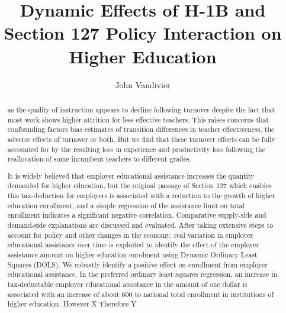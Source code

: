 \documentclass[review]{elsarticle}
\begin{document}
\begin{frontmatter}

\title{
    Dynamic Effects of H-1B and Section 127 Policy Interaction on Higher Education
}

\author[mymainaddress]{John Vandivier} %
\address[mymainaddress]{4400 University Dr, Fairfax, VA 22030}

\begin{abstract}
    as the quality of instruction appears to decline following turnover despite the fact that most work shows higher attrition for less effective teachers.
    This raises concerns that confounding factors bias estimates of transition differences in teacher effectiveness,
    the adverse effects of turnover or both.
    But we find that these turnover effects can be fully accounted for by the resulting loss in experience and productivity loss following the reallocation of some incumbent teachers to different grades.

    It is widely believed that employer educational assistance increases the quantity demanded for higher education,
    but the original passage of Section 127 which enables this tax-deduction for employers is associated with a reduction to the growth of higher education enrollment,
    and a simple regression of the assistance limit on total enrollment indicates a significant negative correlation.
    Comparative supply-side and demand-side explanations are discussed and evaluated.
    After taking extensive steps to account for policy and other changes in the economy,
    real variation in employer educational assistance over time is exploited
    to identify the effect of the employer assistance amount on higher education enrolment using Dynamic Ordinary Least Squares (DOLS).
    We robustly identify a positive effect on enrollment from employer educational assistance.
    In the preferred ordinary least squares regression,
    an increase in tax-deductable employer educational assistance
    in the amount of one dollar is associated with
    an increase of about 600 to national total enrollment in institutions of higher education.
    However X
    Therefore Y


\end{abstract}
\end{frontmatter}
\end{document}
